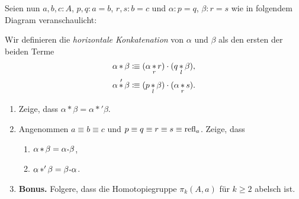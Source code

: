 \documentclass{uebung}
\DeclareMathOperator*{\whisk}{\ast}
\begin{document}
\begin{exercise}
  Seien nun $a,b,c:A$, $p,q:a=b$, $r,s:b=c$ und $\alpha:p=q$, $\beta:r=s$ wie in folgendem Diagram veranschaulicht:
  \begin{center}
  \end{center}
  Wir definieren die \emph{horizontale Konkatenation} von $\alpha$ und $\beta$ als den ersten der beiden Terme
  \begin{align*}
    \alpha\whisk\beta &\colonequiv (\alpha \whisk_r r) \cdot (q \whisk_l \beta),\\
    \alpha\whisk'\beta &\colonequiv (p \whisk_l \beta) \cdot (\alpha \whisk_r s).
  \end{align*}
  \begin{enumerate}
    \item Zeige, dass $\alpha\whisk\beta = \alpha\whisk'\beta$.
    \item Angenommen $a\equiv b\equiv c$ und $p\equiv q\equiv r\equiv s\equiv \mathrm{refl}_a$.
      Zeige, dass
      \begin{enumerate}
        \item $\alpha\whisk\beta = \alpha\kon\beta$,
        \item $\alpha\whisk'\beta = \beta\kon\alpha$.
      \end{enumerate}
    \item \textbf{Bonus.} Folgere, dass die Homotopiegruppe $\pi_k(A,a)$ für $k\geq 2$ abelsch ist.
  \end{enumerate}
\end{exercise}
\end{document}
